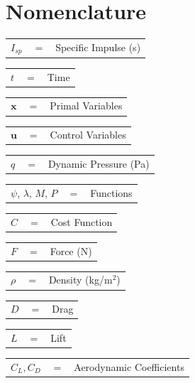 \documentclass[journal]{new-aiaa}
\begin{document}
\section*{Nomenclature}
\noindent
\begin{tabular}{p{1.2cm}p{1cm}p{5cm}}
	 $I_{sp}$ & $=$ & Specific Impulse (s)\\ 
	\end{tabular} 
	  	\begin{tabular}{p{1.2cm}p{1cm}p{5cm}}
	  $t$ & $=$ & Time\\
	  	\end{tabular} 
	  	\begin{tabular}{p{1.2cm}p{1cm}p{5cm}}
	  $\textbf{x}$& $=$ & Primal Variables\\
	  	\end{tabular} 
	  	\begin{tabular}{p{1.2cm}p{1cm}p{5cm}}
	  $\textbf{u}$& $=$ & Control Variables\\
	  	\end{tabular} 
	  	\begin{tabular}{p{1.2cm}p{1cm}p{5cm}}
	  $q$ & $=$ & Dynamic Pressure (Pa)\\
	  	\end{tabular} 
	  	\begin{tabular}{p{1.2cm}p{1cm}p{5cm}}
	  $\psi$, $\lambda$, $M$, $P$ & $=$ & Functions\\
	  	\end{tabular} 
	  	\begin{tabular}{p{1.2cm}p{1cm}p{5cm}}
	  $C$ & $=$ & Cost Function\\
	  	\end{tabular} 
	  	\begin{tabular}{p{1.2cm}p{1cm}p{5cm}}
	  $F$ & $=$ & Force (N)\\
	  	\end{tabular} 
	  	\begin{tabular}{p{1.2cm}p{1cm}p{5cm}}
	  $\rho$ & $=$ & Density (kg/m$^2$)\\
	  	\end{tabular} 
	  			\begin{tabular}{p{1.2cm}p{1cm}p{5cm}}
	  				$D$ & $=$ & Drag\\
	  			\end{tabular} 
	  			\begin{tabular}{p{1.2cm}p{1cm}p{5cm}}
	  				$L$ & $=$ & Lift\\
	  			\end{tabular} 
	  	\begin{tabular}{p{1.2cm}p{1cm}p{5cm}}
	  $C_L,C_D$ & $=$ & Aerodynamic Coefficients\\
	  	\end{tabular} 
\end{document}

